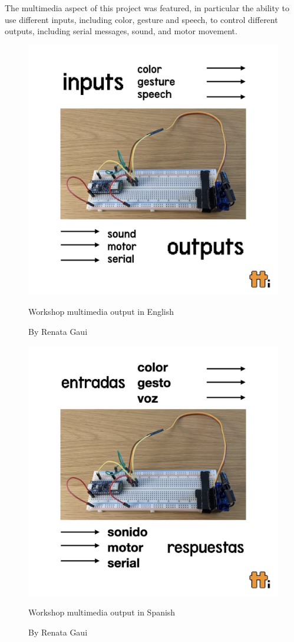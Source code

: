 The multimedia aspect of this project was featured, in particular the ability to use different inputs, including color, gesture and speech, to control different outputs, including serial messages, sound, and motor movement.

\begin{figure}[ht]
  \centering
  \includegraphics[width=0.75\linewidth,height=0.35\textheight,keepaspectratio]{images/workshop-en-2.jpg}
  \caption{Workshop multimedia output in English}
  \caption*{By Renata Gaui}
  \label{fig:workshop-english-flyer-page-2}
\end{figure}

\begin{figure}[ht]
  \centering
  \includegraphics[width=0.75\linewidth,height=0.35\textheight,keepaspectratio]{images/workshop-es-2.jpg}
  \caption{Workshop multimedia output in Spanish}
  \caption*{By Renata Gaui}
  \label{fig:workshop-spanish-flyer-page-2}
\end{figure}

